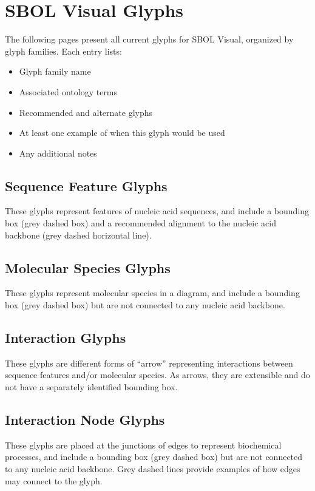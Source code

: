 \section{SBOL Visual Glyphs}\label{apdx:symbols}

The following pages present all current glyphs for SBOL Visual, organized by glyph families.
Each entry lists:
\begin{itemize}
\item Glyph family name
\item Associated ontology terms
\item Recommended and alternate glyphs
\item At least one example of when this glyph would be used
\item Any additional notes
\end{itemize}

\subsection{Sequence Feature Glyphs}\label{apdx:sym:feature}

These glyphs represent features of nucleic acid sequences, and include a bounding box (grey dashed box) and a recommended alignment to the nucleic acid backbone (grey dashed horizontal line).




\subsection{Molecular Species Glyphs}\label{apdx:sym:species}

These glyphs represent molecular species in a diagram, and include a bounding box (grey dashed box) but are not connected to any nucleic acid backbone.




\subsection{Interaction Glyphs}\label{apdx:sym:interaction}

These glyphs are different forms of ``arrow'' representing interactions between sequence features and/or molecular species. As arrows, they are extensible and do not have a separately identified bounding box.



\subsection{Interaction Node Glyphs}\label{apdx:sym:interactionnodes}

These glyphs are placed at the junctions of edges to represent biochemical processes, and include a bounding box (grey dashed box) but are not connected to any nucleic acid backbone. Grey dashed lines provide examples of how edges may connect to the glyph.


